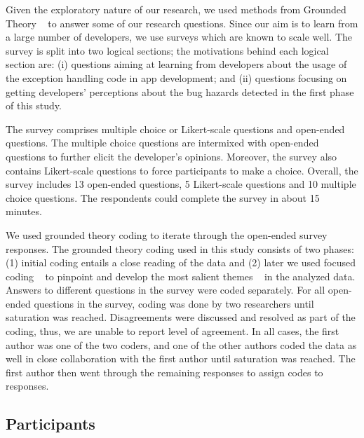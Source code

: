 {%
Given the exploratory nature of our research, we used methods from Grounded Theory ~\cite{charmaz2006} to answer some of our research questions. Since our aim is to learn from a large number of developers, we use surveys which are known to scale well. The survey is split into two logical sections; the motivations behind each logical section are: (i) questions aiming at learning from developers about the usage of the exception handling code in app development;  and (ii) questions focusing on getting developers' perceptions about the bug hazards detected in the first phase of this study.

The survey comprises multiple choice or Likert-scale questions and open-ended questions. The multiple choice questions are intermixed with open-ended questions to further elicit the developer's opinions. Moreover, the survey also contains Likert-scale questions to force participants to make a choice. Overall, the survey includes 13 open-ended questions, 5 Likert-scale questions and 10 multiple choice questions. The respondents could complete the survey in about 15 minutes.

We used grounded theory coding to iterate through the open-ended survey responses. The grounded theory coding used in this study consists of two phases: (1) initial coding entails a close reading of the data and (2) later we used focused coding ~\cite{charmaz2006} to pinpoint and develop the most salient themes ~\cite{charmaz2006} in the analyzed data. Answers to different questions in the survey were coded separately. For all open-ended questions in the survey, coding was done by two researchers until saturation was reached. Disagreements were discussed and resolved as part of the coding, thus, we are unable to report level of agreement. In all cases, the first author was one of the two coders, and one of the other authors coded the data as well in close collaboration with the first author until saturation was reached. The first author then went through the remaining responses to assign codes to responses.

\subsection{Participants}

}
